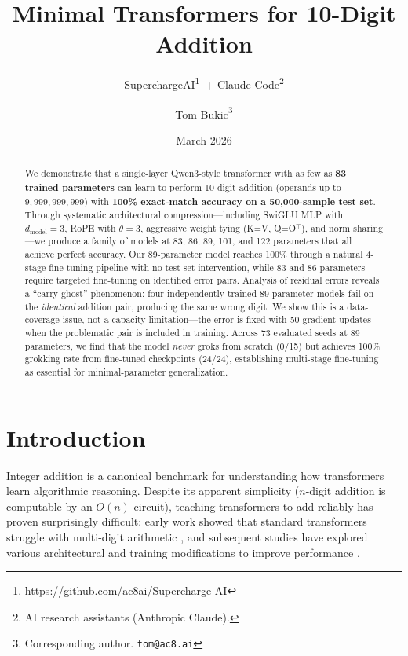 \documentclass[11pt]{article}
\title{Minimal Transformers for 10-Digit Addition}
\author{
  SuperchargeAI\thanks{\url{https://github.com/ac8ai/Supercharge-AI}}\, + Claude Code\thanks{AI research assistants (Anthropic Claude).}
  \and
  Tom Bukic\thanks{Corresponding author. \texttt{tom@ac8.ai}}
}
\date{March 2026}
\begin{document}
\maketitle

\begin{abstract}

We demonstrate that a single-layer Qwen3-style transformer with as few as
\textbf{83 trained parameters} can learn to perform 10-digit addition
(operands up to $9{,}999{,}999{,}999$) with \textbf{100\% exact-match
accuracy on a 50,000-sample test set}. Through systematic architectural
compression---including SwiGLU MLP with $d_\text{model}=3$, RoPE with
$\theta=3$, aggressive weight tying (K=V, Q=O$^\top$), and norm sharing---we
produce a family of models at 83, 86, 89, 101, and 122 parameters that
all achieve perfect accuracy. Our 89-parameter model reaches 100\%
through a natural 4-stage fine-tuning pipeline with no test-set
intervention, while 83 and 86 parameters require targeted fine-tuning on
identified error pairs. Analysis of residual errors reveals a ``carry
ghost'' phenomenon: four independently-trained 89-parameter models fail
on the \emph{identical} addition pair, producing the same wrong digit.
We show this is a data-coverage issue, not a capacity limitation---the
error is fixed with 50 gradient updates when the problematic pair is
included in training. Across 73 evaluated seeds at 89 parameters, we
find that the model \emph{never} groks from scratch (0/15) but achieves
100\% grokking rate from fine-tuned checkpoints (24/24), establishing
multi-stage fine-tuning as essential for minimal-parameter
generalization.

\end{abstract}

\section{Introduction}
\label{sec:intro}

Integer addition is a canonical benchmark for understanding how
transformers learn algorithmic reasoning. Despite its apparent simplicity
($n$-digit addition is computable by an $O(n)$ circuit), teaching
transformers to add reliably has proven surprisingly difficult:
early work showed that standard transformers struggle with multi-digit
arithmetic \citep{nogueira2021investigating}, and subsequent studies have
explored various architectural and training modifications to improve
performance \citep{lee2024teaching, mcleish2024transformers,
jelassi2023length, zhou2024what, zhangli2024reverse}.
\end{document}
